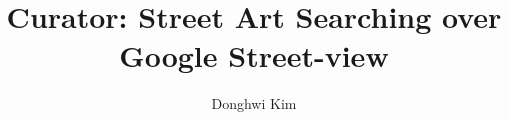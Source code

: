 \documentclass{sig-alternate-10pt}
\begin{document}
\newcommand{\note}[1]{[\textcolor{red}{\textit{#1}}]}
\newcommand{\eat}[1]{}

\newcommand{\name}{Curator}

\newcommand{\oursection}[1]{\vspace{-.0in}\section{#1}\vspace{-.0in}}
\newcommand{\oursubsection}[1]{\vspace{-.0in}\subsection{#1}\vspace{-.0in}}
\newcommand{\oursubsubsection}[1]{\vspace{-.0in}\subsubsection{#1}\vspace{-.0in}}
\newcommand{\ourcaption}[1]{\vspace{-.0in}\caption{\small #1}\vspace{-0.0in}}


\title{\name{}: Street Art Searching over Google Street-view}

\author{\rm{Donghwi Kim}}

\maketitle

%






%



\end{document}
